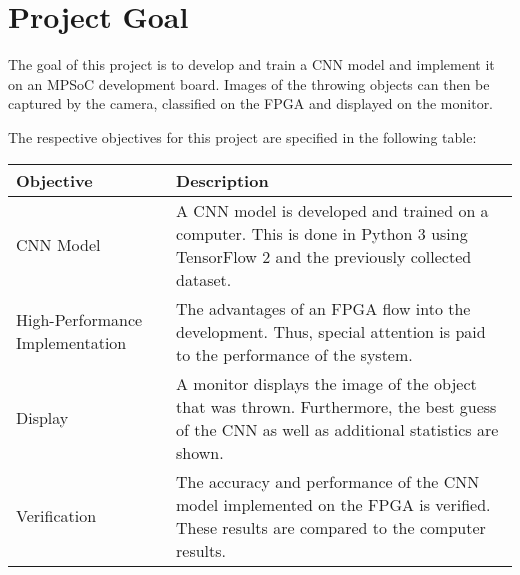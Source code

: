 \chapter{Project Goal}
\label{ch:project_goal}

The goal of this project is to develop and train a CNN model and implement it on an MPSoC development board.
Images of the throwing objects can then be captured by the camera, classified on the FPGA and displayed on the monitor.

The respective objectives for this project are specified in the following table:\\

\begin{tabularx}{\textwidth}{L{3.05cm}X}
  \toprule
  \textbf{Objective} & \textbf{Description} \\
  \midrule
  CNN Model & A CNN model is developed and trained on a computer. This is done in Python 3 using TensorFlow 2 and the previously collected dataset. \\
  \midrule
  High-Performance Implementation & The advantages of an FPGA flow into the development. Thus, special attention is paid to the performance of the system. \\
  \midrule
  Display & A monitor displays the image of the object that was thrown. Furthermore, the best guess of the CNN as well as additional statistics are shown. \\
  \midrule
  Verification & The accuracy and performance of the CNN model implemented on the FPGA is verified. These results are compared to the computer results. \\
  \bottomrule
\end{tabularx}
